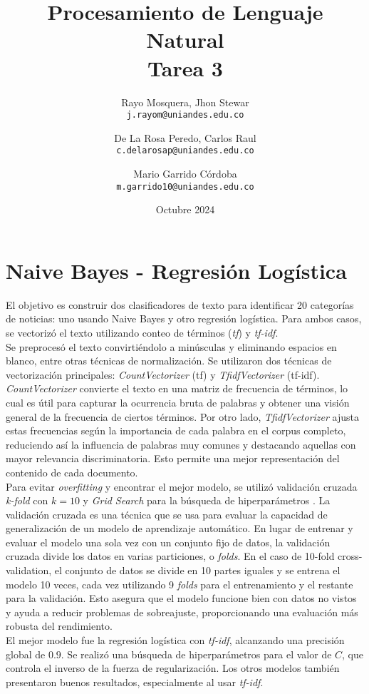 \documentclass[11pt,english]{article}
\title{Procesamiento de Lenguaje Natural\\
Tarea 3
}
\author{
  Rayo Mosquera, Jhon Stewar\\
  \texttt{j.rayom@uniandes.edu.co}
  \and
  De La Rosa Peredo, Carlos Raul\\
  \texttt{c.delarosap@uniandes.edu.co}\and
  Mario Garrido Córdoba\\
   \texttt{m.garrido10@uniandes.edu.co}
  \\ 
}
\date{Octubre 2024}
\theoremstyle{plain}
\begin{document}
\maketitle
\section{Naive Bayes - Regresión Logística}

El objetivo es construir dos clasificadores de texto para identificar 20 categorías de noticias: uno usando Naive Bayes y otro regresión logística. Para ambos casos, se vectorizó el texto utilizando conteo de términos (\textit{tf}) y \textit{tf-idf}.\\

\noindent Se preprocesó el texto convirtiéndolo a minúsculas y eliminando espacios en blanco, entre otras técnicas de normalización. Se utilizaron dos técnicas de vectorización principales: \textit{CountVectorizer} (tf) y \textit{TfidfVectorizer} (tf-idf). \textit{CountVectorizer} convierte el texto en una matriz de frecuencia de términos, lo cual es útil para capturar la ocurrencia bruta de palabras y obtener una visión general de la frecuencia de ciertos términos. Por otro lado, \textit{TfidfVectorizer} ajusta estas frecuencias según la importancia de cada palabra en el corpus completo, reduciendo así la influencia de palabras muy comunes y destacando aquellas con mayor relevancia discriminatoria. Esto permite una mejor representación del contenido de cada documento.\\

\noindent Para evitar \textit{overfitting} y encontrar el mejor modelo, se utilizó validación cruzada \textit{k-fold} con $k=10$ y \textit{Grid Search} para la búsqueda de hiperparámetros \cite{ScikitLearnCrossValidation}. La validación cruzada es una técnica que se usa para evaluar la capacidad de generalización de un modelo de aprendizaje automático. En lugar de entrenar y evaluar el modelo una sola vez con un conjunto fijo de datos, la validación cruzada divide los datos en varias particiones, o \textit{folds}. En el caso de 10-fold cross-validation, el conjunto de datos se divide en 10 partes iguales y se entrena el modelo 10 veces, cada vez utilizando 9 \textit{folds} para el entrenamiento y el restante para la validación. Esto asegura que el modelo funcione bien con datos no vistos y ayuda a reducir problemas de sobreajuste, proporcionando una evaluación más robusta del rendimiento.\\

\noindent El mejor modelo fue la regresión logística con \textit{tf-idf}, alcanzando una precisión global de $0.9$. Se realizó una búsqueda de hiperparámetros para el valor de $C$, que controla el inverso de la fuerza de regularización. Los otros modelos también presentaron buenos resultados, especialmente al usar \textit{tf-idf}.\\
\end{document}
